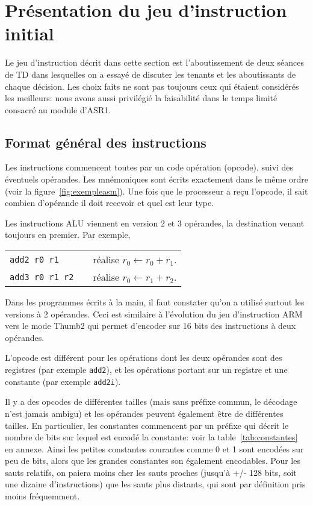 \documentclass[architecture]{compas2018}
\newcommand{\todo}[1]{\textcolor{red}{TODO: #1}}
\begin{document}
\section{Présentation du jeu d'instruction initial}
Le jeu d'instruction décrit dans cette section est l'aboutissement de deux séances de TD dans lesquelles on a essayé de discuter les tenants et les aboutissants de chaque décision.
Les choix faits ne sont pas toujours ceux qui étaient considérés les meilleurs: nous avons aussi privilégié la faisabilité dans le temps limité consacré au module d'ASR1.



\subsection{Format général des instructions}
Les instructions commencent toutes par un code opération (opcode), suivi des éventuels opérandes.
Les mnémoniques sont écrits exactement dans le même ordre (voir la figure~\ref{fig:exempleasm}).  
Une fois que le processeur a reçu l'opcode, il sait combien d'opérande il doit recevoir et quel est leur type.


Les instructions ALU viennent en version 2 et 3 opérandes, la destination venant toujours en premier.
Par exemple, \\
  \begin{tabular}{lcl}
 \texttt{add2 r0 r1}&& réalise $r_0 \leftarrow r_0+r_1$. \\
 \texttt{add3 r0 r1 r2}&& réalise $r_0 \leftarrow r_1+r_2$.
  \end{tabular}
  Dans les programmes écrits à la main, il faut constater qu'on a utilisé surtout les versions à 2 opérandes.
  Ceci est similaire à l'évolution du jeu d'instruction ARM vers le mode Thumb2 qui permet d'encoder sur 16 bits des instructions à deux opérandes. 
  
 L'opcode est différent pour les opérations dont les deux opérandes  sont des registres (par exemple \texttt{add2}), et les opérations portant sur un registre et une constante (par exemple \texttt{add2i}).

Il y a des opcodes de différentes tailles (mais sans préfixe commun, le décodage n'est jamais ambigu)  et les opérandes peuvent également être de différentes tailles.
En particulier, les constantes commencent par un préfixe qui décrit le nombre de bits sur lequel est encodé la constante: voir la table~\ref{tab:constantes} en annexe.
Ainsi les petites constantes courantes comme 0 et 1 sont encodées sur peu de bits, alors que les grandes constantes son également encodables.
Pour les sauts relatifs, on paiera moins cher les sauts proches (jusqu'à +/- 128 bits, soit une dizaine d'instructions) que les sauts plus distants, qui sont par définition pris moins fréquemment.
\end{document}
